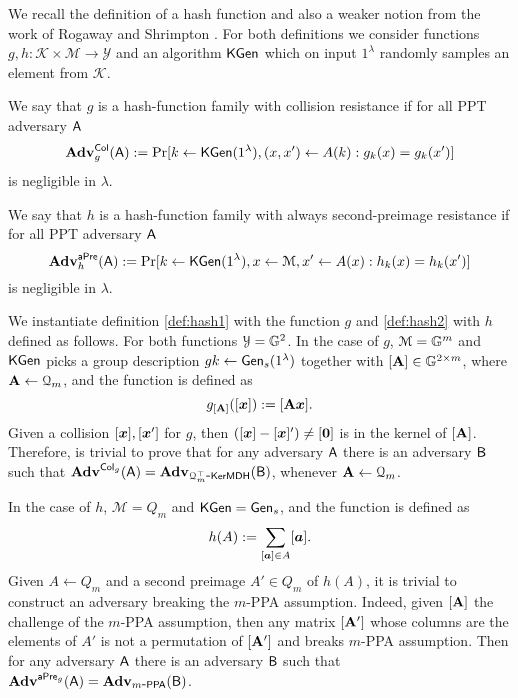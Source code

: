 We recall the definition of a hash function and also a weaker notion from the work of Rogaway and Shrimpton \cite{FSE:RogShr04}. For both definitions we consider functions $g,h:\mathcal{K}\times\mathcal{M}\to\mathcal{Y}$ and an algorithm $\mathsf{KGen}$ which on input $1^\lambda$ randomly samples an element from $\mathcal{K}$.

\begin{definition}\label{def:hash1}
 We say that $g$ is a hash-function family with collision resistance if for all PPT adversary $\mathsf{A}$
$$
\mathbf{Adv}_g^{\mathsf{Col}}(\mathsf{A}) := \Pr[k\gets\mathsf{KGen}(1^\lambda), (x,x')\gets A(k):g_k(x)=g_k(x')]
$$ 
is negligible in $\lambda$.
\end{definition}

\begin{definition}\label{def:hash2}
 We say that $h$ is a hash-function family with always second-preimage resistance if for all PPT adversary $\mathsf{A}$
$$
\mathbf{Adv}_h^{\mathsf{aPre}}(\mathsf{A}) := \Pr[k\gets\mathsf{KGen}(1^\lambda), x\gets\mathcal{M}, x'\gets A(x):h_k(x)=h_k(x')]
$$ 
is negligible in $\lambda$.
\end{definition}

We instantiate definition \ref{def:hash1} with the function $g$ and \ref{def:hash2}  with $h$ defined as follows. For both functions $\mathcal{Y}=\mathbb{G}^2$. In the case of $g$, $\mathcal{M}=\mathbb{G}^m$ and $\mathsf{KGen}$ picks a group description $gk\gets\mathsf{Gen}_s(1^\lambda)$ together with $[\mathbf{{A}}]\in\mathbb{G}^{2\times m}$, where $\mathbf{{A}}\gets\mathcal{Q}_m$, and the function is defined as
$$
g_{[\mathbf{{A}}]}([{\boldsymbol{x}}]):= [\mathbf{{A}}{\boldsymbol{x}}].
$$
Given a collision $[{\boldsymbol{x}}],[{\boldsymbol{x}}']$ for $g$, then $([{\boldsymbol{x}}]-[{\boldsymbol{x}}]')\neq [{\boldsymbol{0}}]$ is in the kernel of $[\mathbf{{A}} ]$. Therefore, is trivial to prove that for any adversary $\mathsf{A}$ there is an adversary $\mathsf{B}$ such that $\mathbf{Adv}^{\mathsf{Col}_g}(\mathsf{A})=\mathbf{Adv}_{\mathcal{Q}_m^\top\mbox{-}\mathsf{KerMDH}}(\mathsf{B})$, whenever $\mathbf{{A}}\gets\mathcal{Q}_m$.

 In the case of $h$, $\mathcal{M}=Q_m$ and $\mathsf{KGen}=\mathsf{Gen}_s$, and the function is defined as
$$
h(A):= \sum_{[{\boldsymbol{a}}]\in A}[{\boldsymbol{a}}].
$$
Given $A\gets Q_m$ and a second preimage $A'\in Q_m$ of $h(A)$, it is trivial to construct an adversary breaking the $m$-PPA assumption. Indeed, given $[\mathbf{{A}}]$ the challenge of the $m$-PPA assumption, then any matrix $[\mathbf{{A}}']$ whose columns are the elements of $A'$ is not a permutation of $[\mathbf{{A}}']$ and breaks $m$-PPA assumption. Then for any adversary $\mathsf{A}$ there is an adversary $\mathsf{B}$ such that $\mathbf{Adv}^{\mathsf{aPre}_g}(\mathsf{A})=\mathbf{Adv}_{m\mbox{-}\mathsf{PPA}}(\mathsf{B})$.

